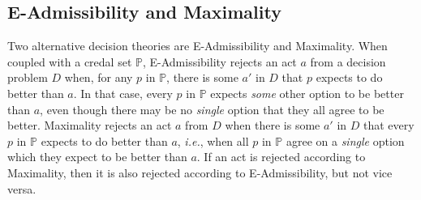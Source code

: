 \documentclass[a4paper]{article}
\newtheorem{definition}{Definition}
\renewcommand\P{\mathbb{P}} %
\newcommand\Exp{\mathsf{Exp}}
\newcommand\U{\mathfrak{U}} %
\newcommand\Maximin{\Gamma}
\renewcommand\S{\mathcal{S}}
\newcommand\s{\mathsf{s}}
\newcommand{\IB}{\mathbb{B}}
\newcommand{\IP}{\P}
\newcommand{\todoold}[2][]{\todo[backgroundcolor=white,bordercolor=orange!10,linecolor=gray!10, #1,caption={},textcolor=gray]{Pre-rev: #2}}
\newcommand{\todooldinfo}[2][]{\todoold[#1]{#2}}
\renewcommand{\leq}{\leqslant}
\newenvironment{CCM rewritten}
{\begingroup\color{blue}} %
{\endgroup}              %
\begin{document}


\subsection{E-Admissibility and Maximality}\label{sect:e-admiss}\label{sect:Max}


{ Two alternative decision theories are E-Admissibility and Maximality. When coupled with a credal set $\IP$, E-Admissibility rejects an act $a$ from a decision problem $D$ when, for any $p$ in $\IP$, there is some $a'$ in $D$ that $p$ expects to do better than $a$. In that case, every $p$ in $\IP$ expects \emph{some} other option to be better than $a$, even though there may be no \emph{single} option that they all agree to be better. Maximality rejects an act $a$ from $D$ when there is some $a'$ in $D$ that every $p$ in $\IP$ expects to do better than $a$, \emph{i.e.}, when all $p$ in $\IP$ agree on a \emph{single} option which they expect to be better than $a$. If an act is rejected according to Maximality, then it is also rejected according to E-Admissibility, but not vice versa.}
\end{document}
